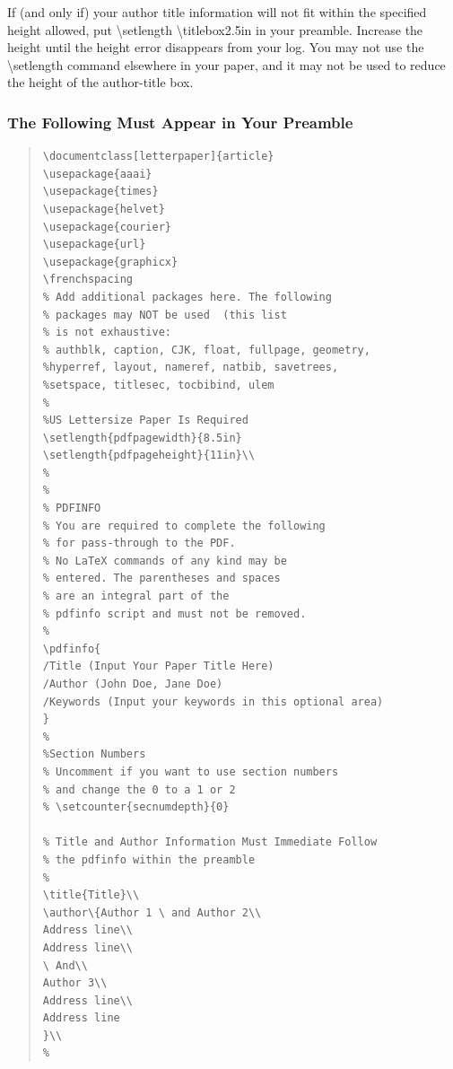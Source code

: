 \documentclass[letterpaper]{article} %
\begin{document}
If (and only if) your author title information will not fit within the specified  height allowed, put \textbackslash setlength \textbackslash titlebox{2.5in} in your preamble. Increase the height until the height error disappears from your log. You may not use the  \textbackslash setlength command elsewhere in your paper, and it may not be used to reduce the height of the author-title box.

\subsubsection{The Following Must Appear in Your Preamble}
\begin{quote}
\begin{scriptsize}\begin{verbatim}
\documentclass[letterpaper]{article}
\usepackage{aaai}
\usepackage{times}
\usepackage{helvet}
\usepackage{courier}
\usepackage{url}
\usepackage{graphicx}
\frenchspacing
% Add additional packages here. The following
% packages may NOT be used  (this list
% is not exhaustive:
% authblk, caption, CJK, float, fullpage, geometry, 
%hyperref, layout, nameref, natbib, savetrees, 
%setspace, titlesec, tocbibind, ulem
%
%US Lettersize Paper Is Required
\setlength{pdfpagewidth}{8.5in}
\setlength{pdfpageheight}{11in}\\
%
%
% PDFINFO
% You are required to complete the following
% for pass-through to the PDF. 
% No LaTeX commands of any kind may be
% entered. The parentheses and spaces 
% are an integral part of the 
% pdfinfo script and must not be removed.
%
\pdfinfo{
/Title (Input Your Paper Title Here)
/Author (John Doe, Jane Doe)
/Keywords (Input your keywords in this optional area)
}
%
%Section Numbers
% Uncomment if you want to use section numbers
% and change the 0 to a 1 or 2
% \setcounter{secnumdepth}{0}

% Title and Author Information Must Immediate Follow
% the pdfinfo within the preamble
%
\title{Title}\\
\author\{Author 1 \ and Author 2\\
Address line\\
Address line\\
\ And\\
Author 3\\
Address line\\
Address line
}\\
%
\end{verbatim}\end{scriptsize}
\end{quote}
\end{document}
